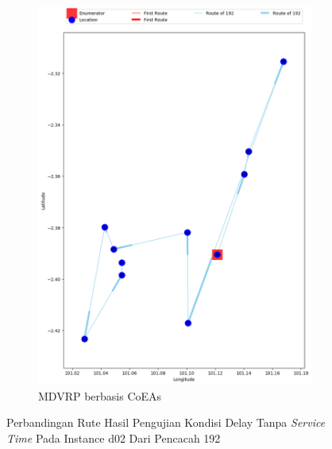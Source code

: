 \begin{figure}[H]
	\centering
	\begin{subfigure}[t]{\textwidth}
		\centering
		\includegraphics[width=\textwidth]{Resources/Images/delayed_2/real_m15_n100_delayed_2_192_coes}
		\caption{MDVRP berbasis CoEAs}
		\label{fig:real_m15_n100_delayed_2_192_coes}
	\end{subfigure}
	\caption{Perbandingan Rute Hasil Pengujian Kondisi Delay Tanpa \textit{Service Time} Pada Instance d02 Dari Pencacah 192}
	\label{fig:real_m15_n100_delayed_2_192}
\end{figure}



